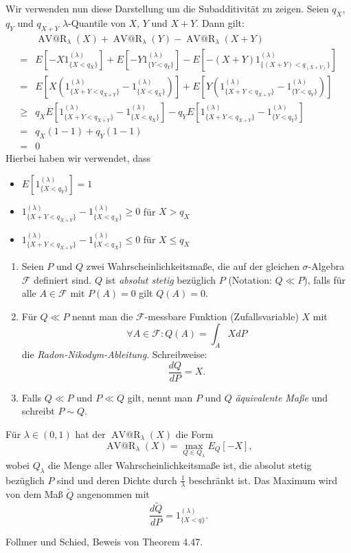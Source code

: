 \documentclass[a4paper,twoside,DIV15,BCOR12mm]{scrbook}
\makeatletter
\newcommand{\cF}{\mathcal F}
\DeclareMathOperator{\AVatR}{AV@R}
\makeatother
\begin{document}
\begin{beweis}
Wir verwenden nun diese Darstellung um die Subadditivität zu zeigen. Seien $q_X$, $q_Y$ und $q_{X+Y}$ $\lambda$-Quantile von $X$, $Y$ und $X+Y$. Dann gilt:
\begin{align*}
&\AVatR_\lambda(X) + \AVatR_\lambda(Y) - \AVatR_\lambda(X+Y) \\
=&E[-X 1_{\{X<q_X\}}^{(\lambda)}] + E[-Y 1_{\{Y<q_Y\}}^{(\lambda)}] - E[-(X+Y) 1_{\{(X+Y)<q_{(X+Y)}\}}^{(\lambda)}]\\
=&E[X(1_{\{X+Y<q_{X+Y}\}}^{(\lambda)} - 1_{\{X<q_X\}}^{(\lambda)})]
+ E[Y(1_{\{X+Y<q_{X+Y}\}}^{(\lambda)} - 1_{\{Y<q_Y\}}^{(\lambda)})] \\
\ge& q_X E[1_{\{X+Y<q_{X+Y}\}}^{(\lambda)} - 1_{\{X<q_X\}}^{(\lambda)}]
- q_Y E[1_{\{X+Y<q_{X+Y}\}}^{(\lambda)} - 1_{\{Y<q_Y\}}^{(\lambda)}] \\
=& q_X(1-1) + q_Y(1-1)\\
=& 0
\end{align*}
Hierbei haben wir verwendet, dass
\begin{itemize}
\item $E[1_{\{X<q_Y\}}^{(\lambda)}] = 1$ 
\item $1_{\{X+Y<q_{X+Y}\}}^{(\lambda)} - 1_{\{X<q_X\}}^{(\lambda)} \ge 0$ für $X>q_X$
\item $1_{\{X+Y<q_{X+Y}\}}^{(\lambda)} - 1_{\{X<q_X\}}^{(\lambda)} \le 0$ für $X\le q_X$
\end{itemize}
\end{beweis}

\begin{bemerkung}
\begin{enumerate}
\item Seien $P$ und $Q$ zwei Wahrscheinlichkeitsmaße, die auf der gleichen $\sigma$-Algebra $\cF$ definiert sind. $Q$ ist \emph{absolut stetig} bezüglich $P$ (Notation: $Q\ll P$), falls für alle $A\in\cF$ mit $P(A)=0$ gilt $Q(A)=0$.
\item Für $Q\ll P$ nennt man die $\cF$-messbare Funktion (Zufallsvariable) $X$ mit 
\[
\forall A\in\cF: Q(A) = \int_A X dP
\]
die \emph{Radon-Nikodym-Ableitung}. Schreibweise:
\[
\frac{dQ}{dP} = X.
\]
\item Falls $Q\ll P$ und $P\ll Q$ gilt, nennt man $P$ und $Q$ \emph{äquivalente Maße} und schreibt $P\sim Q$.
\end{enumerate}
\end{bemerkung}

\begin{satz}
Für $\lambda\in(0,1)$ hat der $\AVatR_\lambda(X)$ die Form
\[
\AVatR_\lambda(X) = \max_{Q\in Q_\lambda}E_Q[-X],
\]
wobei $Q_\lambda$ die Menge aller Wahrscheinlichkeitsmaße ist, die absolut stetig bezüglich $P$ sind und deren Dichte durch $\frac1\lambda$ beschränkt ist. Das Maximum wird von dem Maß $\tilde Q$ angenommen mit
\[
\frac{d\tilde Q}{dP} = 1_{\{X<q\}}^{(\lambda)}.
\]
\end{satz}
\begin{beweis}
Follmer und Schied, Beweis von Theorem 4.47.
\end{beweis}
\end{document}
